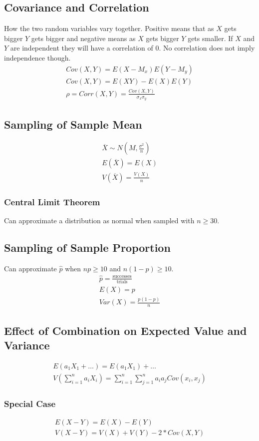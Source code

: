 \subsection{Covariance and Correlation}
How the two random variables vary together. Positive means that as $X$ gets bigger $Y$ gets bigger and negative means as $X$ gets bigger $Y$ gets smaller. If $X$ and $Y$ are independent they will have a correlation of $0$. No correlation does not imply independence though. 
\begin{align}
  Cov(X, Y) = E(X - M_x)E(Y - M_y) \\
  Cov(X, Y) = E(XY) - E(X)E(Y) \\
  \rho = Corr(X, Y) = \frac{Cov(X, Y)}{\sigma_x\sigma_y}
\end{align}

\subsection{Sampling of Sample Mean}
\begin{align}
  \overbar{X} \sim N(M, \frac{\sigma^2}{n}) \\
  E(\overbar{X}) = E(X) \\
  V(\overbar{X}) = \frac{V(X)}{n}
\end{align}

\subsubsection{Central Limit Theorem}
Can approximate a distribution as normal when sampled with $n \geq 30$.

\subsection{Sampling of Sample Proportion}
Can approximate $\hat{p}$ when $np \geq 10$ and $n(1 - p) \geq 10$.
\begin{align}
  \hat{p} = \frac{\text{successes}}{\text{trials}} \\
  E(X) = p \\
  Var(X) = \frac{p(1-p)}{n}
\end{align}

\subsection{Effect of Combination on Expected Value and Variance}
\begin{align}
  E(a_1X_1 + \ldots) = E(a_1X_1) + \ldots \\
  V(\sum_{i=1}^{n} a_iX_i) = \sum_{i=1}^{n} \sum_{j=1}^{n} a_ia_jCov(x_i, x_j)
\end{align}

\subsubsection{Special Case}
\begin{align}
  E(X - Y) = E(X) - E(Y) \\
  V(X - Y) = V(X) + V(Y) - 2 * Cov(X, Y)
\end{align}
